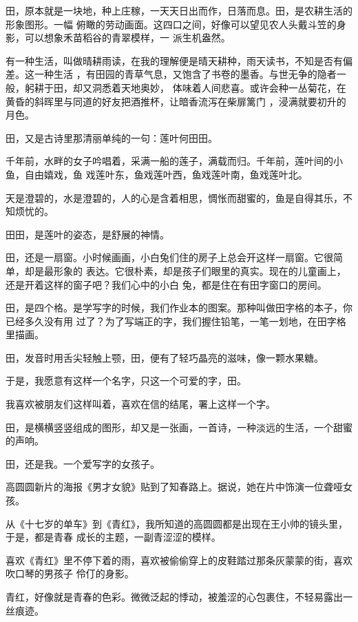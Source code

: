 \documentclass[12pt,a4paper]{article}
\begin{document}
		田，原本就是一块地，种上庄稼，一天天日出而作，日落而息。田，是农耕生活的形象图形。一幅
	俯瞰的劳动画面。这四口之间，好像可以望见农人头戴斗笠的身影，可以想象禾苗稻谷的青翠模样，一
	派生机盎然。

		有一种生活，叫做晴耕雨读，在我的理解便是晴天耕种，雨天读书，不知是否有偏差。这一种生活
	，有田园的青草气息，又饱含了书卷的墨香。与世无争的隐者一般，躬耕于田，却又洞悉着天地奥妙，
	体味着人间悲喜。或许会种一丛菊花，在黄昏的斜晖里与同道的好友把酒推杯，让暗香流泻在柴扉篱门
	，浸满就要初升的月色。


		田，又是古诗里那清丽单纯的一句：莲叶何田田。

		千年前，水畔的女子吟唱着，采满一船的莲子，满载而归。千年前，莲叶间的小鱼，自由嬉戏，鱼
	戏莲叶东，鱼戏莲叶西，鱼戏莲叶南，鱼戏莲叶北。

		天是澄碧的，水是澄碧的，人的心是含着相思，惆怅而甜蜜的，鱼是自得其乐，不知烦忧的。

		田田，是莲叶的姿态，是舒展的神情。

		田，还是一扇窗。小时候画画，小白兔们住的房子上总会开这样一扇窗。它很简单，却是最形象的
	表达。它很朴素，却是孩子们眼里的真实。现在的儿童画上，还是开着这样的窗子吧？我们心中的小白
	兔，都是住在有田字窗口的房间。

		田，是四个格。是学写字的时候，我们作业本的图案。那种叫做田字格的本子，你已经多久没有用
	过了？为了写端正的字，我们握住铅笔，一笔一划地，在田字格里描画。

		田，发音时用舌尖轻触上颚，田，便有了轻巧晶亮的滋味，像一颗水果糖。

		于是，我愿意有这样一个名字，只这一个可爱的字，田。

		我喜欢被朋友们这样叫着，喜欢在信的结尾，署上这样一个字。

		田，是横横竖竖组成的图形，却又是一张画，一首诗，一种淡远的生活，一个甜蜜的声响。

		田，还是我。一个爱写字的女孩子。

	\endwriting



		高圆圆新片的海报《男才女貌》贴到了知春路上。据说，她在片中饰演一位聋哑女孩。

		从《十七岁的单车》到《青红》，我所知道的高圆圆都是出现在王小帅的镜头里，于是，都是青春
	成长的主题，一副青涩涩的模样。

		喜欢《青红》里不停下着的雨，喜欢被偷偷穿上的皮鞋踏过那条灰蒙蒙的街，喜欢吹口琴的男孩子
	伶仃的身影。

		青红，好像就是青春的色彩。微微泛起的悸动，被羞涩的心包裹住，不轻易露出一丝痕迹。
\end{document}
